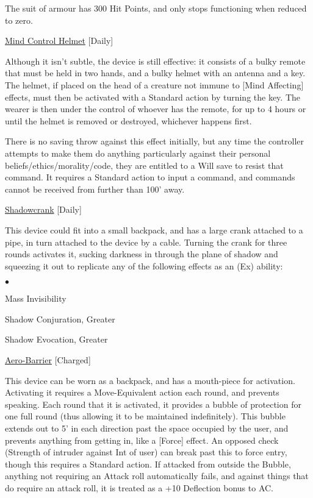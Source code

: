 \smallskip\noindent The suit of armour has 300 Hit Points, and only stops functioning when reduced to zero.

\medskip\noindent\underline{Mind Control Helmet} [Daily]

\noindent Although it isn't subtle, the device is still effective: it consists of a bulky remote that must be held in two hands, and a bulky helmet with an antenna and a key. The helmet, if placed on the head of a creature not immune to [Mind Affecting] effects, must then be activated with a Standard action by turning the key. The wearer is then under the control of whoever has the remote, for up to 4 hours or until the helmet is removed or destroyed, whichever happens first.

\smallskip\noindent There is no saving throw against this effect initially, but any time the controller attempts to make them do anything particularly against their personal beliefs/ethics/morality/code, they are entitled to a Will save to resist that command. It requires a Standard action to input a command, and commands cannot be received from further than 100' away.

\medskip\noindent\underline{Shadowcrank} [Daily]

\noindent This device could fit into a small backpack, and has a large crank attached to a pipe, in turn attached to the device by a cable. Turning the crank for three rounds activates it, sucking darkness in through the plane of shadow and squeezing it out to replicate any of the following effects as an (Ex) ability:

\begin{list}{$\bullet$}{\itemspace}
\item Mass Invisibility
\item Shadow Conjuration, Greater
\item Shadow Evocation, Greater
\end{list}

\medskip\noindent\underline{Aero-Barrier} [Charged]

\noindent This device can be worn as a backpack, and has a mouth-piece for activation. Activating it requires a Move-Equivalent action each round, and prevents speaking. Each round that it is activated, it provides a bubble of protection for one full round (thus allowing it to be maintained indefinitely). This bubble extends out to 5' in each direction past the space occupied by the user, and prevents anything from getting in, like a [Force] effect. An opposed check (Strength of intruder against Int of user) can break past this to force entry, though this requires a Standard action. If attacked from outside the Bubble, anything not requiring an Attack roll automatically fails, and against things that do require an attack roll, it is treated as a +10 Deflection bonus to AC.


